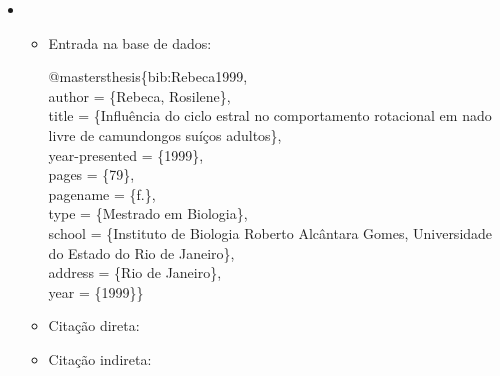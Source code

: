 \documentclass[a4paper,12pt,oneside,onecolumn]{uerj}
\newcommand{\formato}[1]{\begin{flushleft}{#1}\end{flushleft}}
\begin{document}
\begin{itemize}[label={Ex.:},leftmargin=\parindent,parsep=0pt,itemsep=0pt]
  \item \formato{\citetext{bib:Rebeca1999}}

  \begin{itemize}[leftmargin=*,parsep=0pt,itemsep=0pt]
    \item Entrada na base de dados:

    \formato{
      @mastersthesis\{bib:Rebeca1999,\\
      author          = \{Rebeca, Rosilene\},\\
      title           = \{Influência do ciclo estral no comportamento rotacional 
                          em nado livre de camundongos suíços adultos\},\\
      year-presented  = \{1999\},\\
      pages           = \{79\},\\
      pagename        = \{f.\},\\
      type            = \{Mestrado em Biologia\},\\
      school          = \{Instituto de Biologia Roberto Alcântara Gomes,
                          Universidade do Estado do Rio de Janeiro\},\\
      address         = \{Rio de Janeiro\},\\
      year            = \{1999\}\}\\
    }

    \item Citação direta: 
    \item Citação indireta: \cite{bib:Rebeca1999}
  \end{itemize}
\end{itemize}
\end{document}
